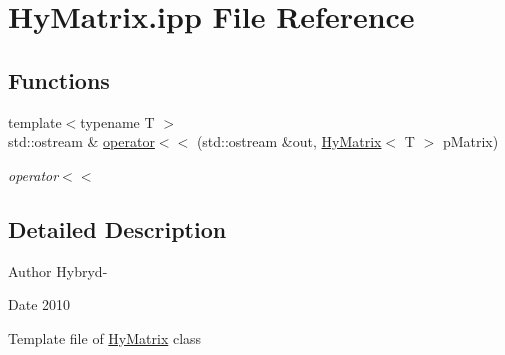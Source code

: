 \hypertarget{HyMatrix_8ipp}{
\section{HyMatrix.ipp File Reference}
\label{HyMatrix_8ipp}
}
\subsection*{Functions}
\begin{DoxyCompactItemize}
\item 
\hypertarget{HyMatrix_8ipp_a2eba6b409fcf84fe2f78304cd4b3eb08}{
{\footnotesize template$<$typename T $>$ }\\std::ostream \& \hyperlink{HyMatrix_8ipp_a2eba6b409fcf84fe2f78304cd4b3eb08}{operator$<$$<$} (std::ostream \&out, \hyperlink{classHyMatrix}{HyMatrix}$<$ T $>$ pMatrix)}
\label{HyMatrix_8ipp_a2eba6b409fcf84fe2f78304cd4b3eb08}

\begin{DoxyCompactList}\small\item\em operator$<$$<$ \item\end{DoxyCompactList}\end{DoxyCompactItemize}


\subsection{Detailed Description}
\begin{DoxyAuthor}{Author}
Hybryd-\/ 
\end{DoxyAuthor}
\begin{DoxyDate}{Date}
2010
\end{DoxyDate}
Template file of \hyperlink{classHyMatrix}{HyMatrix} class 